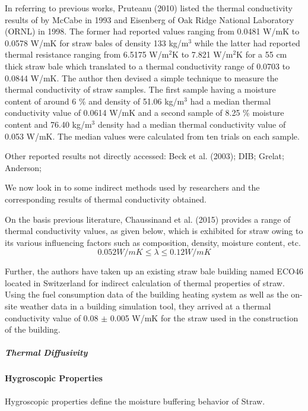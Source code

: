 \documentclass[]{article}
\let\oldparagraph\paragraph
\renewcommand{\paragraph}[1]{\oldparagraph{#1}\mbox{}}
\let\oldsubparagraph\subparagraph
\renewcommand{\subparagraph}[1]{\oldsubparagraph{#1}\mbox{}}
\begin{document}
 In referring to previous works, Pruteanu (2010) listed the thermal
conductivity results of by McCabe in 1993 and Eisenberg of Oak Ridge
National Laboratory (ORNL) in 1998. The former had reported values
ranging from 0.0481 W/mK to 0.0578 W/mK for straw bales of density 133
kg/m\(^{3}\) while the latter had reported thermal resistance ranging
from 6.5175 W/m\(^{2}\)K to 7.821 W/m\(^{2}\)K for a 55 cm thick straw
bale which translated to a thermal conductivity range of 0.0703 to
0.0844 W/mK. The author then devised a simple technique to measure the
thermal conductivity of straw samples. The first sample having a
moisture content of around 6 \% and density of 51.06 kg/m\(^{3}\) had a
median thermal conductivity value of 0.0614 W/mK and a second sample of
8.25 \% moisture content and 76.40 kg/m\(^{3}\) density had a median
thermal conductivity value of 0.053 W/mK. The median values were
calculated from ten trials on each sample.

 Other reported results not directly accessed: Beck et al. (2003); DIB;
Grelat; Anderson;

 We now look in to some indirect methods used by researchers and the
corresponding results of thermal conductivity obtained.

 On the basis previous literature, Chaussinand et al. (2015) provides a
range of thermal conductivity values, as given below, which is exhibited
for straw owing to its various influencing factors such as composition,
density, moisture content, etc.\\

\[0.052 W/mK \leq \lambda \leq 0.12 W/mK\]

Further, the authors have taken up an existing straw bale building named
ECO46 located in Switzerland for indirect calculation of thermal
properties of straw. Using the fuel consumption data of the building
heating system as well as the on-site weather data in a building
simulation tool, they arrived at a thermal conductivity value of 0.08
\(\pm\) 0.005 W/mK for the straw used in the construction of the
building.\\

\hypertarget{header-n59}{%
\subparagraph{Thermal Diffusivity}\label{header-n59}}

\hypertarget{header-n60}{%
\paragraph{Hygroscopic Properties}\label{header-n60}}

 Hygroscopic properties define the moisture buffering behavior of Straw.
\end{document}
